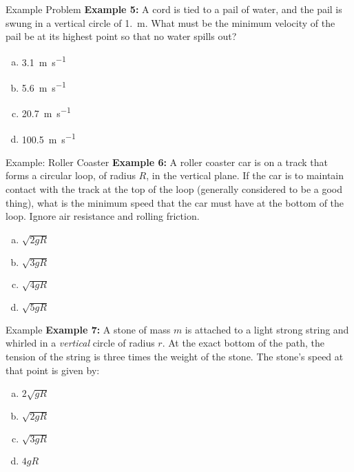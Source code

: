 \documentclass[12pt,compress,aspectratio=169]{beamer}
\begin{document}
\begin{frame}{Example Problem}
  \textbf{Example 5:} A cord is tied to a pail of water, and the pail is swung
  in a vertical circle of \SI{1.}{\metre}. What must be the minimum velocity of
  the pail be at its highest point so that no water spills out?

  \begin{enumerate}[(a)]
  \item\SI{3.1}{\metre\per\second}
  \item\SI{5.6}{\metre\per\second}
  \item\SI{20.7}{\metre\per\second}
  \item\SI{100.5}{\metre\per\second}
  \end{enumerate}
\end{frame}



\begin{frame}{Example: Roller Coaster}
  \textbf{Example 6:} A roller coaster car is on a track that forms a circular
  loop, of radius $R$, in the vertical plane. If the car is to maintain contact
  with the track at the top of the loop (generally considered to be a good
  thing), what is the minimum speed that the car must have at the bottom of the
  loop. Ignore air resistance and rolling friction.
  \begin{enumerate}[(a)]
  \item $\sqrt{2gR}$
  \item $\sqrt{3gR}$
  \item $\sqrt{4gR}$
  \item $\sqrt{5gR}$
  \end{enumerate}
\end{frame}



\begin{frame}{Example}
  \textbf{Example 7:} A stone of mass $m$ is attached to a light strong string
  and whirled in a \emph{vertical} circle of radius $r$. At the exact bottom of
  the path, the tension of the string is three times the weight of the stone.
  The stone's speed at that point is given by:
  \begin{enumerate}[(a)]
  \item $2\sqrt{gR}$
  \item $\sqrt{2gR}$
  \item $\sqrt{3gR}$
  \item $4gR$
  \end{enumerate}
\end{frame}
\end{document}
